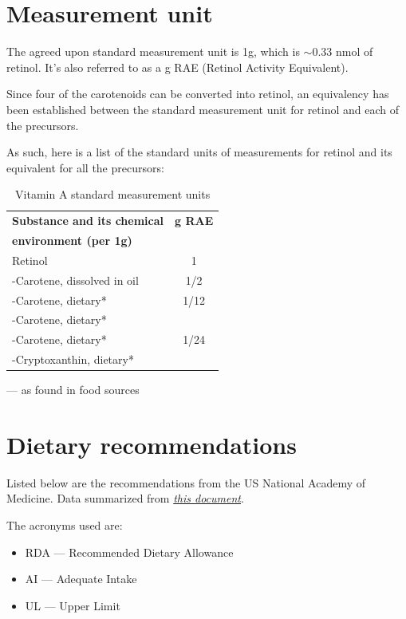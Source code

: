 \documentclass{book}
\begin{document}
\begin{sloppypar}
\section{Measurement unit}
The agreed upon standard measurement unit is 1\textmu g, which is $\sim$0.33 nmol of retinol. It's also referred to as a \textmu g RAE (Retinol Activity Equivalent).

Since four of the carotenoids can be converted into retinol, an equivalency has been established between the standard measurement unit for retinol and each of the precursors.

As such, here is a list of the standard units of measurements for retinol and its equivalent for all the precursors:

\begin{table}[ht]
	\caption{Vitamin A standard measurement units}
	\centering \begin{tabular}{| l | c |}
		\hline
		\textbf{Substance and its chemical}		& \textbf{\textmu g RAE}	\\
		\textbf{environment (per 1\textmu g)}	&							\\ \hline
		Retinol									& 1							\\ \hline
		\textbeta -Carotene, dissolved in oil	& 1/2						\\ \hline
		\textbeta -Carotene, dietary*			& 1/12						\\ \hline
		\textalpha -Carotene, dietary*			&							\\
		\textgamma -Carotene, dietary*			& 1/24						\\
		\textbeta -Cryptoxanthin, dietary*		&							\\ \hline
	\end{tabular}
	\begin{tablenotes}
		\centering \item * --- as found in food sources
	\end{tablenotes}
\end{table}
\newpage

\section{Dietary recommendations}
Listed below are the recommendations from the US National Academy of Medicine. Data summarized from \href{https://nap.nationalacademies.org/read/10026/chapter/6}{\textit{this document}}.

The acronyms used are:
\begin{itemize}
	\item RDA --- Recommended Dietary Allowance
	\item AI --- Adequate Intake
	\item UL --- Upper Limit
\end{itemize}


\end{sloppypar}
\end{document}
